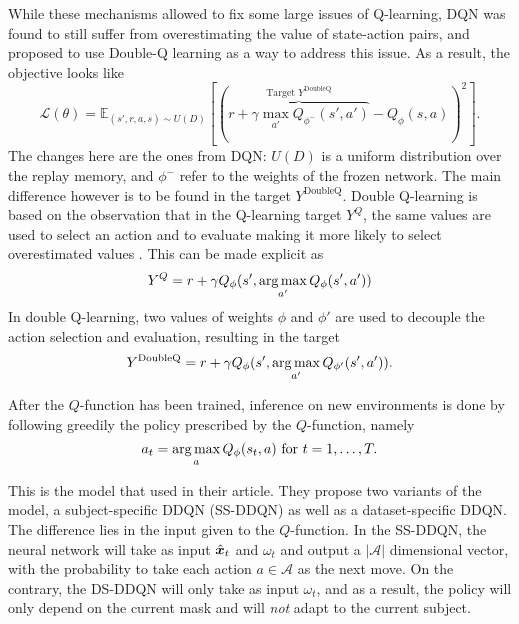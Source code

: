 While these mechanisms allowed to fix some large issues of Q-learning, DQN was found to still suffer from overestimating the value of state-action pairs, and \citet{van2016deep} proposed to use Double-Q learning as a way to address this issue. As a result, the objective looks like 
$$\mathcal{L}(\theta) = \mathbb{E}_{(s',r,a,s)\sim U(D)}[(\overbrace{r + \gamma \max_{a'} Q_{\phi^-}(s',a')}^{\text{Target } Y^{\text{DoubleQ}}} - Q_\phi(s,a))^2].$$
The changes here are the ones from DQN: $U(D)$ is a uniform distribution over the replay memory, and $\phi^-$ refer to the weights of the frozen network. The main difference however is to be found in the target $Y^{\text{DoubleQ}}$. Double Q-learning is based on the observation that in the Q-learning target $Y^Q$, the same values are used to select an action and to evaluate making it more likely to select overestimated values \citep{hasselt2010double}. This can be made explicit as
$$Y^Q = r + \gamma Q_\phi(s', \operatorname*{arg\,max}_{a'} Q_\phi(s',a'))$$
In double Q-learning, two values of weights $\phi$ and $\phi'$ are used to decouple the action selection and evaluation, resulting in the target
$$Y^{\text{DoubleQ}} = r + \gamma Q_\phi(s', \operatorname*{arg\,max}_{a'} Q_{\phi'}(s',a')).$$

After the $Q$-function has been trained, inference on new environments is done by following greedily the policy prescribed by the $Q$-function, namely
$$a_t = \operatorname*{arg\,max}_a Q_\phi(s_t,a) \text{~for~}t=1,\ldots,T.$$


This is the model that \citet{pineda2020active} used in their article. They propose two variants of the model, a subject-specific DDQN (SS-DDQN) as well as a dataset-specific DDQN. The difference lies in the input given to the $Q$-function. In the SS-DDQN, the neural network will take as input $\hat{{\bm{x}}}_t$ and $\omega_t$ and output a $|\mathcal{A}|$ dimensional vector, with the probability to take each action $a \in \mathcal{A}$ as the next move. On the contrary, the DS-DDQN will only take as input $\omega_t$, and as a result, the policy will only depend on the current mask and will \textit{not} adapt to the current subject.

